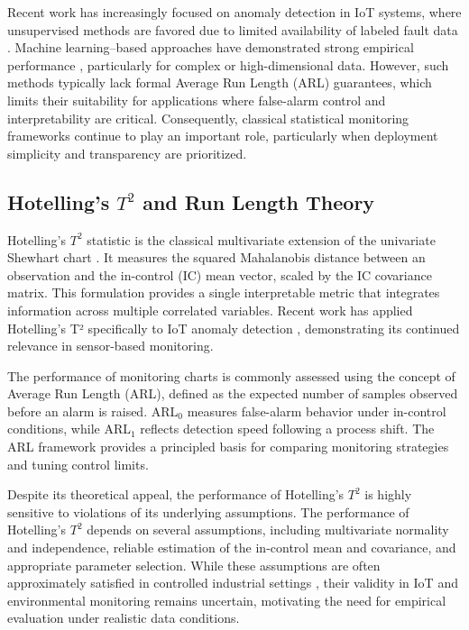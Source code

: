 Recent work has increasingly focused on anomaly detection in \ac{IoT} systems, where unsupervised methods are favored due to limited availability of labeled fault data \cite{Belay2023}. Machine learning–based approaches have demonstrated strong empirical performance \cite{Kim2025}, particularly for complex or high-dimensional data. However, such methods typically lack formal Average Run Length (\ac{ARL}) guarantees, which limits their suitability for applications where false-alarm control and interpretability are critical. Consequently, classical statistical monitoring frameworks continue to play an important role, particularly when deployment simplicity and transparency are prioritized.

\subsection{Hotelling’s $T^2$ and Run Length Theory}

Hotelling’s $T^2$ statistic is the classical multivariate extension of the univariate Shewhart chart \cite{Sauter1992}. It measures the squared Mahalanobis distance between an observation and the in-control (\ac{IC}) mean vector, scaled by the \ac{IC} covariance matrix. This formulation provides a single interpretable metric that integrates information across multiple correlated variables. Recent work has applied Hotelling’s T² specifically to IoT anomaly detection \cite{Fontenot2025}, demonstrating its continued relevance in sensor-based monitoring.

The performance of monitoring charts is commonly assessed using the concept of Average Run Length (\ac{ARL}), defined as the expected number of samples observed before an alarm is raised. \ac{ARL}$_0$ measures false-alarm behavior under in-control conditions, while \ac{ARL}$_1$ reflects detection speed following a process shift. The \ac{ARL} framework provides a principled basis for comparing monitoring strategies and tuning control limits.

Despite its theoretical appeal, the performance of Hotelling’s $T^2$ is highly sensitive to violations of its underlying assumptions. The performance of Hotelling’s $T^2$ depends on several assumptions, including multivariate normality and independence, reliable estimation of the in-control mean and covariance, and appropriate parameter selection. While these assumptions are often approximately satisfied in controlled industrial settings \cite{Kourti2005}, their validity in \ac{IoT} and environmental monitoring remains uncertain, motivating the need for empirical evaluation under realistic data conditions.


